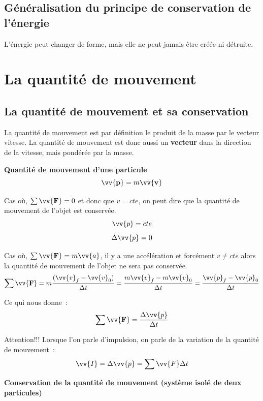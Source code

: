 \documentclass{article}
\begin{document}
\subsection{Généralisation du principe de conservation de l'énergie}
L'énergie peut changer de forme, mais elle ne peut jamais être créée ni détruite.


\section{La quantité de mouvement}
\subsection{La quantité de mouvement et sa conservation}
La quantité de mouvement est par définition le produit de la masse par le vecteur vitesse. La quantité de mouvement est donc aussi un \textbf{vecteur} dans la direction de la vitesse, mais pondérée par la masse.
\newline

\noindent
\textbf{Quantité de mouvement d'une particule 
\[\vv{\mathbf{p}} = m\vv{\mathbf{v}}\]}
\newline

Cas où, $\sum\vv{\mathbf{F}} = 0$ et donc que $ v = cte $, on peut dire que la quantité de mouvement de l'objet est conservée.
\[\vv{p} = cte\]
\[\Delta \vv{p} = 0\]
\newline

Cas où, $\sum\vv{\mathbf{F}} = m\vv{a}$, il y a une accélération et forcément $v \neq cte$ alors la quantité de mouvement de l'objet ne sera pas conservée.
\[\sum\vv{\mathbf{F}} = m\frac{(\vv{v}_f - \vv{v}_0)}{\Delta t} = \frac{m\vv{v}_f - m\vv{v}_0}{\Delta t} = \frac{\vv{p}_f - \vv{p}_0}{\Delta t}\]
\newline

Ce qui nous donne :
\[\sum \vv{\mathbf{F}} = \frac{\Delta \vv{p}}{\Delta t}\]

Attention!!! Lorsque l'on parle d'impulsion, on parle de la variation de la quantité de mouvement : 
\newline
\[\vv{I} = \Delta \vv{p} = \sum\vv{F}\Delta t\]
\newline

\noindent
\textbf{Conservation de la quantité de mouvement (système isolé de deux particules)}
\newline
\end{document}
